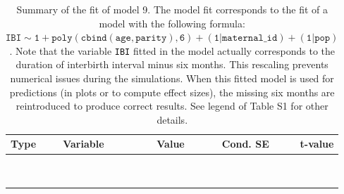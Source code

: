 \begin{table}[H]

\caption{\label{tab:tab9}Summary of the fit of model 9. The model fit corresponds to the fit of a model with the following formula: {\small$\mathtt{IBI \sim 1 + poly(cbind(age, parity), 6) + (1 | maternal\_id) + (1 | pop)}$}. Note that the variable \texttt{IBI} fitted in the model actually corresponds to the duration of interbirth interval minus six months. This rescaling prevents numerical issues during the simulations. When this fitted model is used for predictions (in plots or to compute effect sizes), the missing six months are reintroduced to produce correct results. See legend of Table S1 for other details.}
\centering
\fontsize{8}{10}\selectfont
\begin{tabular}[t]{>{\raggedright\arraybackslash}p{3cm}>{\raggedright\arraybackslash}p{5cm}rrr}
\toprule
Type & Variable & Value & Cond. SE & t-value\\
\midrule
\cellcolor{gray!6}{fixed effects} & \cellcolor{gray!6}{$\beta_1$} & \cellcolor{gray!6}{3.44} & \cellcolor{gray!6}{0.0578} & \cellcolor{gray!6}{59.6}\\
\cellcolor{gray!6}{} & \cellcolor{gray!6}{$\beta_{\mathtt{age}}$} & \cellcolor{gray!6}{-63.4} & \cellcolor{gray!6}{21.9} & \cellcolor{gray!6}{-2.9}\\
\cellcolor{gray!6}{} & \cellcolor{gray!6}{$\beta_{\mathtt{age}^2}$} & \cellcolor{gray!6}{39.5} & \cellcolor{gray!6}{19.6} & \cellcolor{gray!6}{2.01}\\
\cellcolor{gray!6}{} & \cellcolor{gray!6}{$\beta_{\mathtt{age}^3}$} & \cellcolor{gray!6}{-31.2} & \cellcolor{gray!6}{13} & \cellcolor{gray!6}{-2.4}\\
\cellcolor{gray!6}{} & \cellcolor{gray!6}{$\beta_{\mathtt{age}^4}$} & \cellcolor{gray!6}{14.9} & \cellcolor{gray!6}{6.31} & \cellcolor{gray!6}{2.37}\\
\cellcolor{gray!6}{} & \cellcolor{gray!6}{$\beta_{\mathtt{age}^5}$} & \cellcolor{gray!6}{-4.98} & \cellcolor{gray!6}{2.42} & \cellcolor{gray!6}{-2.06}\\
\cellcolor{gray!6}{} & \cellcolor{gray!6}{$\beta_{\mathtt{age}^6}$} & \cellcolor{gray!6}{4.01} & \cellcolor{gray!6}{1.01} & \cellcolor{gray!6}{3.95}\\
\cellcolor{gray!6}{} & \cellcolor{gray!6}{$\beta_{\mathtt{parity}}$} & \cellcolor{gray!6}{120} & \cellcolor{gray!6}{40.7} & \cellcolor{gray!6}{2.96}\\
\cellcolor{gray!6}{} & \cellcolor{gray!6}{$\beta_{\mathtt{age}\times\mathtt{parity}}$} & \cellcolor{gray!6}{-29655} & \cellcolor{gray!6}{15604} & \cellcolor{gray!6}{-1.9}\\

\end{tabular}
\end{table}
